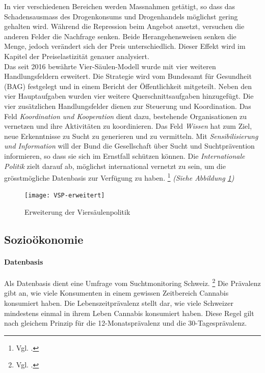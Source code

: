 \documentclass[../main.tex]{subfiles}
\begin{document}
  	\noindent
	In vier verschiedenen Bereichen werden Massnahmen getätigt, so dass das Schadensausmass des Drogenkonsums und Drogenhandels möglichst gering gehalten wird.
	Während die Repression beim Angebot ansetzt, versuchen die anderen Felder die Nachfrage senken.
	Beide Herangehensweisen senken die Menge, jedoch verändert sich der Preis unterschiedlich. 
	Dieser Effekt wird im Kapitel der Preiselastizität genauer analysiert.\\
	
	\noindent
	Das seit 2016 bewährte Vier-Säulen-Modell wurde mit vier weiteren Handlungsfeldern erweitert. 
	Die Strategie wird vom Bundesamt für Gesundheit (BAG) festgelegt und in einem Bericht der Öffentlichkeit mitgeteilt.
	Neben den vier Hauptaufgaben wurden vier weitere Querschnittsaufgaben hinzugefügt.
	Die vier zusätzlichen Handlungsfelder dienen zur Steuerung und Koordination.
	Das Feld \textit{Koordination und Kooperation} dient dazu, bestehende Organisationen zu vernetzen und ihre Aktivitäten zu koordinieren.
	Das Feld \textit{Wissen} hat zum Ziel, neue Erkenntnisse zu Sucht zu generieren und zu vermitteln.
	Mit \textit{Sensibilisierung und Information} will der Bund die Gesellschaft über Sucht und Suchtprävention informieren, so dass sie sich im Ernstfall schützen können.
	Die \textit{Internationale Politik} zielt darauf ab, möglichst international vernetzt zu sein, um die grösstmögliche Datenbasis zur Verfügung zu haben.%
	\footnote{Vgl. \cite{bag-01}.}
	\textit{(Siehe Abbildung \ref{fig:vsp})}

	\noindent	 
	\begin{figure}[H]
		\centering
		\texttt{[image: VSP-erweitert]}
		\captionsetup{font=small}
		\caption[Erweiterung der Viersäulenpolitik]{Erweiterung der Viersäulenpolitik\protect\footnotemark}		
		\label{fig:vsp}
	\end{figure}
	
	\subsection{Sozioökonomie}
	
	\paragraph{Datenbasis}
	Als Datenbasis dient eine Umfrage vom Suchtmonitoring Schweiz.%
	\footnote{Vgl. \cite{gmel}.}
	Die Prävalenz gibt an, wie viele Konsumenten in einem gewissen Zeitbereich Cannabis konsumiert haben.
	Die Lebenszeitprävalenz stellt dar, wie viele Schweizer mindestens einmal in ihrem Leben Cannabis konsumiert haben.
	Diese Regel gilt nach gleichem Prinzip für die 12-Monatsprävalenz und die 30-Tagesprävalenz.
	
\end{document}
